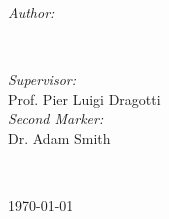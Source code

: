 \begin{titlepage}
    \begin{minipage}{0.4\textwidth}
        \begin{flushleft} \large
            \emph{Author:}\\
            \@author %
        \end{flushleft}
    \end{minipage}
    ~
    \begin{minipage}{0.4\textwidth}
        \begin{flushright} \large
            \emph{Supervisor:} \\
            Prof. Pier Luigi Dragotti \\[1.2em] %
            \emph{Second Marker:} \\
            Dr. Adam Smith %
        \end{flushright}
    \end{minipage}\\[2cm]
    \makeatother



    {\large \today}\\[2cm] %

    \vfill %

\end{titlepage}